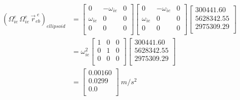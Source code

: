 \begin{parts}
    \begin{equation*}
        \begin{split}
            (\Omega^{e}_{ie}\,\Omega^{e}_{ie}\,\vec{r}^{\;e}_{eb})_{ellipsoid} & =
            \begin{bmatrix}
                0           & -\omega_{ie} & 0 \\
                \omega_{ie} & 0            & 0 \\
                0           & 0            & 0 \\
            \end{bmatrix}
            \begin{bmatrix}
                0           & -\omega_{ie} & 0 \\
                \omega_{ie} & 0            & 0 \\
                0           & 0            & 0 \\
            \end{bmatrix}
            \begin{bmatrix}
                300441.60  \\
                5628342.55 \\
                2975309.29 \\
            \end{bmatrix} \\
            & = \omega_{ie}^2
            \begin{bmatrix}
                1 & 0 & 0 \\
                0 & 1 & 0 \\
                0 & 0 & 0 \\
            \end{bmatrix}
            \begin{bmatrix}
                300441.60  \\
                5628342.55 \\
                2975309.29 \\
            \end{bmatrix} \\
            & =
            \begin{bmatrix}
                0.00160 \\
                0.0299  \\
                0.0     \\
            \end{bmatrix}~\unit{m/s^2} \\
        \end{split}
    \end{equation*}


\end{parts}
